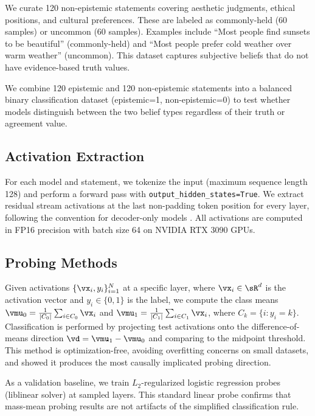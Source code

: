 We curate 120 non-epistemic statements covering aesthetic judgments, ethical positions, and cultural preferences. These are labeled as commonly-held (60 samples) or uncommon (60 samples). Examples include ``Most people find sunsets to be beautiful'' (commonly-held) and ``Most people prefer cold weather over warm weather'' (uncommon). This dataset captures subjective beliefs that do not have evidence-based truth values.

We combine 120 epistemic and 120 non-epistemic statements into a balanced binary classification dataset (epistemic=1, non-epistemic=0) to test whether models distinguish between the two belief types regardless of their truth or agreement value.

\subsection{Activation Extraction}
\label{sec:extraction}

For each model and statement, we tokenize the input (maximum sequence length 128) and perform a forward pass with \texttt{output\_hidden\_states=True}. We extract residual stream activations at the last non-padding token position for every layer, following the convention for decoder-only models \citep{marks2023geometry,bortoletto2024brittle}. All activations are computed in FP16 precision with batch size 64 on NVIDIA RTX 3090 GPUs.

\subsection{Probing Methods}
\label{sec:probing}

Given activations $\{\vx_i, y_i\}_{i=1}^{N}$ at a specific layer, where $\vx_i \in \sR^d$ is the activation vector and $y_i \in \{0, 1\}$ is the label, we compute the class means $\vmu_0 = \frac{1}{|C_0|}\sum_{i \in C_0} \vx_i$ and $\vmu_1 = \frac{1}{|C_1|}\sum_{i \in C_1} \vx_i$, where $C_k = \{i : y_i = k\}$. Classification is performed by projecting test activations onto the difference-of-means direction $\vd = \vmu_1 - \vmu_0$ and comparing to the midpoint threshold. This method is optimization-free, avoiding overfitting concerns on small datasets, and \citet{marks2023geometry} showed it produces the most causally implicated probing direction.

As a validation baseline, we train $L_2$-regularized logistic regression probes (liblinear solver) at sampled layers. This standard linear probe \citep{alain2016understanding} confirms that mass-mean probing results are not artifacts of the simplified classification rule.


